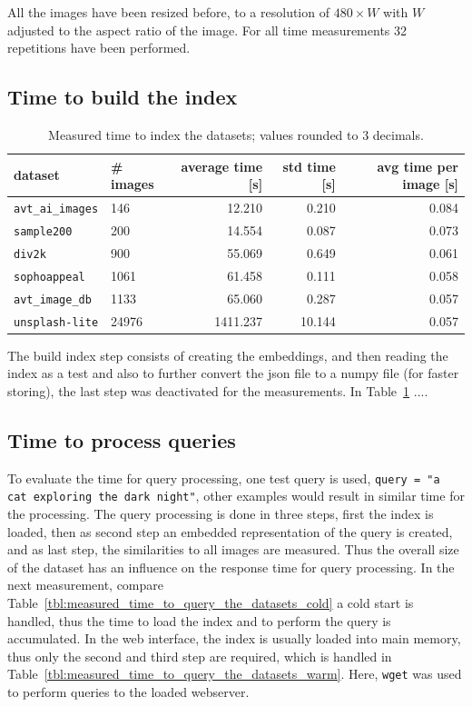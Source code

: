 \documentclass{article}
\begin{document}
All the images have been resized before, to a resolution of $480\times W$ with $W$ adjusted to the aspect ratio of the image.
For all time measurements 32 repetitions have been performed.

\subsection{Time to build the index}

\begin{table}[htb!]
\centering
\caption{Measured time to index the datasets; values rounded to 3 decimals.}
\label{tbl:measured_time_to_index_the_datasets_}
\begin{tabular}{llrrr}
\toprule
dataset                  & \# images & average time [s] & std time [s] & avg time per image [s] \\
\midrule
\texttt{avt\_ai\_images} & 146       & 12.210            & 0.210         & 0.084 \\
\texttt{sample200}       & 200       & 14.554           & 0.087        & 0.073 \\
\texttt{div2k}           & 900       & 55.069           & 0.649        & 0.061 \\
\texttt{sophoappeal}     & 1061      & 61.458           & 0.111        & 0.058 \\
\texttt{avt\_image\_db}  & 1133      & 65.060            & 0.287        & 0.057 \\
\texttt{unsplash-lite}   & 24976     & 1411.237         & 10.144       & 0.057 \\
\bottomrule
\end{tabular}
\end{table}


The build index step consists of creating the embeddings, and then reading the index as a test and also to further convert the json file to a numpy file (for faster storing), the last step was deactivated for the measurements.
In Table~\ref{tbl:measured_time_to_index_the_datasets_} ....

\subsection{Time to process queries}
To evaluate the time for query processing, one test query is used, \texttt{query = "a cat exploring the dark night"}, other examples would result in similar time for the processing.
The query processing is done in three steps, first the index is loaded, then as second step an embedded representation of the query is created, and as last step, the similarities to all images are measured.
Thus the overall size of the dataset has an influence on the response time for query processing.
In the next measurement, compare Table~\ref{tbl:measured_time_to_query_the_datasets_cold} a cold start is handled, thus the time to load the index and to perform the query is accumulated.
In the web interface, the index is usually loaded into main memory, thus only the second and third step are required, which is handled in Table~\ref{tbl:measured_time_to_query_the_datasets_warm}.
Here, \texttt{wget} was used to perform queries to the loaded webserver.
\end{document}
